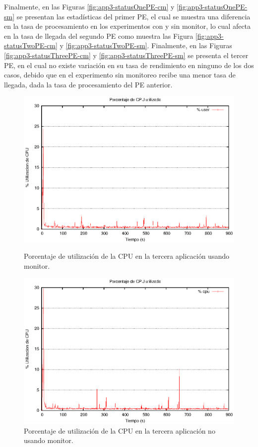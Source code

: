 Finalmente, en las Figuras \ref{fig:app3-statusOnePE-cm} y \ref{fig:app3-statusOnePE-sm} se presentan las estadísticas del primer PE, el cual se muestra una diferencia en la tasa de procesamiento en los experimentos con y sin monitor, lo cual afecta en la tasa de llegada del segundo PE como muestra las Figura \ref{fig:app3-statusTwoPE-cm} y \ref{fig:app3-statusTwoPE-sm}. Finalmente, en las Figuras \ref{fig:app3-statusThreePE-cm} y \ref{fig:app3-statusThreePE-sm} se presenta el tercer PE, en el cual no existe variación en su tasa de rendimiento en ninguno de los dos casos, debido que en el experimento sin monitoreo recibe una menor tasa de llegada, dada la tasa de procesamiento del PE anterior.

\begin{figure}[!hptb]
\centering

\begin{minipage}[c]{0.45\textwidth}
\centering
    \includegraphics[width=\textwidth]{images/exp/app3/cm/fisical/consumeCPU.eps}
    \caption{Porcentaje de utilización de la CPU en la tercera aplicación usando monitor.}
    \label{fig:app3-consumeCPU-cm}
\end{minipage} \hspace*{1cm}
\begin{minipage}[c]{0.45\textwidth}
\centering
    \includegraphics[width=\textwidth]{images/exp/app3/sm/fisical/consumeCPU.eps}
    \caption{Porcentaje de utilización de la CPU en la tercera aplicación no usando monitor.}
    \label{fig:app3-consumeCPU-sm}
\end{minipage}


\end{figure}
